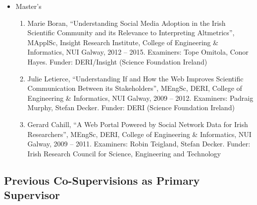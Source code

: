 \documentclass[10pt,a4paper]{res} %
\begin{document}
\begin{resume}
\begin{itemize}
\begin{enumerate}
\end{enumerate}
\item Master's
\begin{enumerate} \itemsep -2pt
\item Marie Boran, ``Understanding Social Media Adoption in the Irish Scientific Community and its Relevance to Interpreting Altmetrics'', MApplSc, Insight Research Institute, College of Engineering \& Informatics, NUI Galway, 2012 -- 2015. Examiners: Tope Omitola, Conor Hayes. Funder: DERI/Insight (Science Foundation Ireland)
\item Julie Letierce, ``Understanding If and How the Web Improves Scientific Communication Between its Stakeholders'', MEngSc, DERI, College of Engineering \& Informatics, NUI Galway, 2009 -- 2012. Examiners: Padraig Murphy, Stefan Decker. Funder: DERI (Science Foundation Ireland)
\item Gerard Cahill, ``A Web Portal Powered by Social Network Data for Irish Researchers'', MEngSc, DERI, College of Engineering \& Informatics, NUI Galway, 2009 -- 2011. Examiners: Robin Teigland, Stefan Decker. Funder: Irish Research Council for Science, Engineering and Technology
\end{enumerate}
\end{itemize}

\subsection*{Previous Co-Supervisions as Primary Supervisor}


\end{resume}
\end{document}
